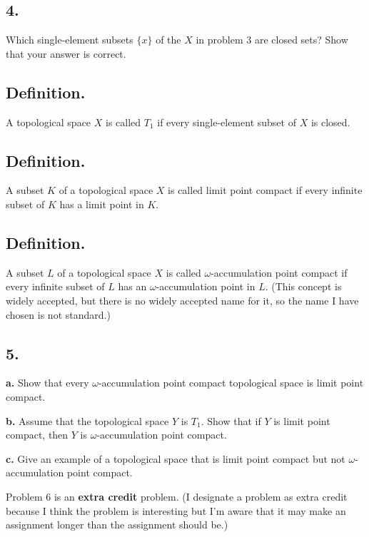 \documentclass{amsart}
\theoremstyle{plain}
\theoremstyle{definition}
\theoremstyle{remark}
\begin{document}
\vspace{.15in}
\noindent
\subsection*{4.} Which single-element subsets $\{ x\}$ of the $X$ in problem 3 are closed sets? Show that your answer is correct. 

\vspace{.15in}
\noindent
\subsection*{Definition.} A topological space $X$ is called $T_1$ if every single-element subset of $X$ is closed. 

\vspace{.15in}
\noindent
\subsection*{Definition.}  A subset $K$ of a topological space $X$ is called limit point compact if every infinite subset of $K$ has a limit point in $K$. 


\vspace{.15in}
\noindent
\subsection*{Definition.}  A subset $L$ of a topological space $X$ is called $\omega$-accumulation point compact if every infinite subset of $L$ has an $\omega$-accumulation point in $L$. (This concept is widely accepted, but there is no widely accepted name for it, so the name I have chosen is not standard.)


\vspace{.15in}
\noindent
\subsection*{5.} 

{\bfseries a.} Show that every $\omega$-accumulation point compact topological space is limit point compact. 

{\bfseries b.} Assume that the topological space $Y$ is $T_1$. Show that if $Y$ is limit point compact, then $Y$ is $\omega$-accumulation point compact. 

{\bfseries c.} Give an example of a topological space that is limit point compact but not $\omega$-accumulation point compact. 

\vspace{.15in}
Problem 6 is an {\bf extra credit} problem. (I designate a problem as extra credit because I think the problem is interesting but I'm aware that it may make an assignment longer than the assignment should be.)
\end{document}
